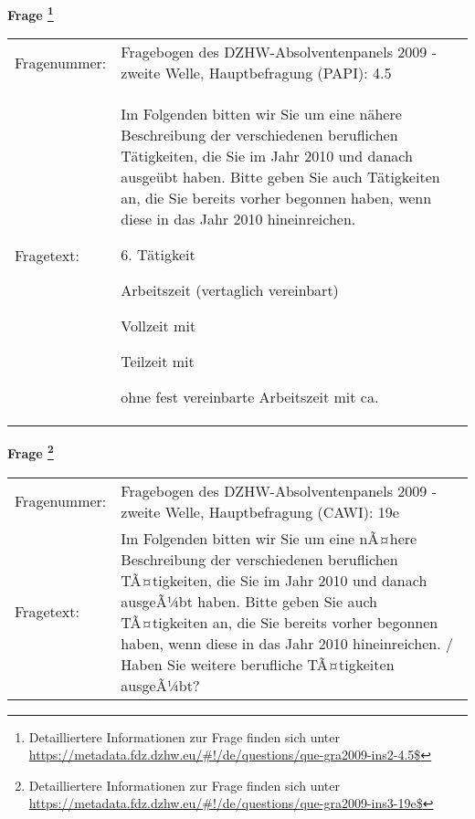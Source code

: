 				\vspace*{0.5cm}
                \noindent\textbf{Frage
	                \footnote{Detailliertere Informationen zur Frage finden sich unter
		              \url{https://metadata.fdz.dzhw.eu/\#!/de/questions/que-gra2009-ins2-4.5$}}}\\
				\begin{tabularx}{\hsize}{@{}lX}
					Fragenummer: &
					  Fragebogen des DZHW-Absolventenpanels 2009 - zweite Welle, Hauptbefragung (PAPI):
					  4.5
 \\
					Fragetext: & Im Folgenden bitten wir Sie um eine nähere Beschreibung der verschiedenen beruflichen Tätigkeiten, die Sie im Jahr 2010 und danach ausgeübt haben. Bitte geben Sie auch Tätigkeiten an, die Sie bereits vorher begonnen haben, wenn diese in das Jahr 2010 hineinreichen.\par  6. Tätigkeit\par  Arbeitszeit (vertaglich vereinbart)\par  Vollzeit mit\par  Teilzeit mit\par  ohne fest vereinbarte Arbeitszeit mit ca. \\
				\end{tabularx}
				\vspace*{0.5cm}
                \noindent\textbf{Frage
	                \footnote{Detailliertere Informationen zur Frage finden sich unter
		              \url{https://metadata.fdz.dzhw.eu/\#!/de/questions/que-gra2009-ins3-19e$}}}\\
				\begin{tabularx}{\hsize}{@{}lX}
					Fragenummer: &
					  Fragebogen des DZHW-Absolventenpanels 2009 - zweite Welle, Hauptbefragung (CAWI):
					  19e
 \\
					Fragetext: & Im Folgenden bitten wir Sie um eine nÃ¤here Beschreibung der verschiedenen beruflichen TÃ¤tigkeiten, die Sie im Jahr 2010 und danach ausgeÃ¼bt haben. Bitte geben Sie auch TÃ¤tigkeiten an, die Sie bereits vorher begonnen haben, wenn diese in das Jahr 2010 hineinreichen. / Haben Sie weitere berufliche TÃ¤tigkeiten ausgeÃ¼bt? \\
				\end{tabularx}





